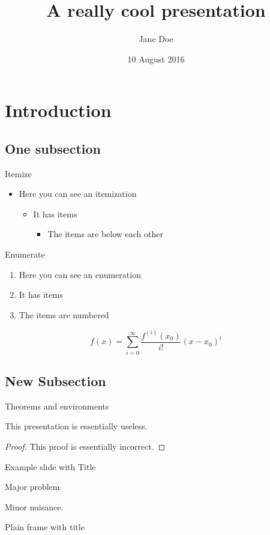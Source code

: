 \documentclass{beamer}
\author{Jane Doe}
\title{A really cool presentation}
\date{10 August 2016}
\institute[Awesome institute short]{Awesome institute with a reaaaaaallllllyyyyy long name}
\begin{document}

\section{Introduction}
\subsection{One subsection}
\begin{frame}{Itemize}
  \begin{itemize}
    \item Here you can see an itemization
      \begin{itemize}
        \item It has items
          \begin{itemize}
            \item The items are below each other
          \end{itemize}
      \end{itemize}
  \end{itemize}
\end{frame}

\begin{frame}{Enumerate}
  \begin{enumerate}
    \item Here you can see an enumeration
    \item It has items
    \item The items are numbered
  \end{enumerate}
  \[
    f(x)=\sum_{i=0}^\infty \frac{f^{(i)}(x_0)}{i!}(x-x_0)^i
  \]
\end{frame}

\subsection{New Subsection}
\begin{frame}{Theorems and environments}
  \begin{theorem}
    This presentation is essentially useless.
  \end{theorem}
  \begin{proof}
    This proof is essentially incorrect.
  \end{proof}
\end{frame}

\begin{frame}{Example slide with Title}
  \begin{example}
    Major problem.
  \end{example}
  \begin{solution}
    Minor nuisance.
  \end{solution}
\end{frame}

\begin{frame}[plain]{Plain frame with title}
  \lipsum[1]
\end{frame}
\end{document}
